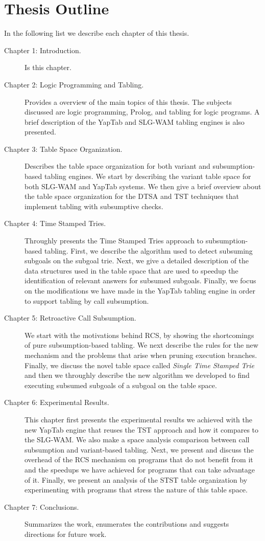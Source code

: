 \section{Thesis Outline}

In the following list we describe each chapter of this thesis.

\begin{description}

   \item[Chapter 1: Introduction.] Is this chapter.
   
   \item[Chapter 2: Logic Programming and Tabling.] Provides a overview of the main topics of this thesis.
   The subjects discussed are logic programming, Prolog, and tabling for logic programs. A brief description
   of the YapTab and SLG-WAM tabling engines is also presented.
   
   \item[Chapter 3: Table Space Organization.] Describes the table space organization for both variant and
   subsumption-based tabling engines. We start by describing the variant table space for both SLG-WAM and
   YapTab systems. We then give a brief overview about the table space organization for the DTSA and TST
   techniques that implement tabling with subsumptive checks.
   
   \item[Chapter 4: Time Stamped Tries.] Throughly presents the Time Stamped Tries approach to subsumption-based
   tabling. First, we describe the algorithm used to detect subsuming subgoals on the subgoal trie. Next,
   we give a detailed description of the data structures used in the table space that are used to speedup
   the identification of relevant answers for subsumed subgoals. Finally, we focus on the modifications we have
   made in the YapTab tabling engine in order to support tabling by call subsumption.
   
   \item[Chapter 5: Retroactive Call Subsumption.] We start with the motivations behind RCS, by showing the shortcomings
   of pure subsumption-based tabling. We next describe the rules for the new mechanism and the problems that arise
   when pruning execution branches. Finally, we discuss the novel table space called \emph{Single Time Stamped Trie}
   and then we throughly describe the new algorithm we developed to find executing subsumed subgoals of a subgoal on the
   table space.
   
   \item[Chapter 6: Experimental Results.] This chapter first presents the experimental results we achieved with
   the new YapTab engine that reuses the TST approach and how it compares to the SLG-WAM. We also make a space
   analysis comparison between call subsumption and variant-based tabling.
   Next, we present and discuss the overhead of the RCS mechanism on programs that do not benefit from it and
   the speedups we have achieved for programs that can take advantage of it. Finally, we present an analysis of
   the STST table organization by experimenting with programs that stress the nature of this table space.
   
   \item[Chapter 7: Conclusions.] Summarizes the work, enumerates the contributions and suggests directions for
   future work.
   
\end{description}
